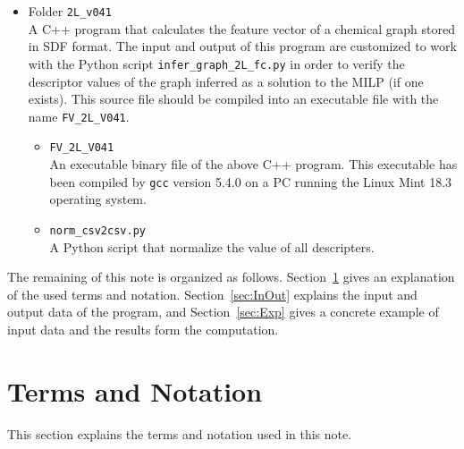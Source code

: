 \documentclass[11pt, titlepage, dvipdfmx, twoside]{article}
\begin{document}
\begin{itemize}
\begin{itemize}
\item Folder {\tt 2L\_v041}\\
A C++ program that calculates the feature vector of 
a chemical graph stored in SDF format.
The input and output of this program are customized to work with 
the Python script {\tt infer\_graph\_2L\_fc.py}
in order to verify the descriptor values
of the graph inferred as a solution to the MILP (if one exists).
This source file should be compiled into an executable file
with the name {\tt FV\_2L\_V041}.
\begin{itemize}
\item {\tt FV\_2L\_V041}\\
An executable binary file of the above C++ program.
This executable has been compiled 
by {\tt gcc} version 5.4.0
on a PC running the Linux Mint 18.3 operating system.
%
\item {\tt norm\_csv2csv.py}\\
A Python script that normalize the value of all descripters.
\end{itemize}

\end{itemize}
\end{itemize}



The remaining of this note is organized as follows.
Section~\ref{sec:Pre} gives an explanation 
of the used terms and notation.
%
Section~\ref{sec:InOut} explains the 
input and output data of the program,
and Section~\ref{sec:Exp} gives a concrete
example of input data and the results form the computation.


\section{Terms and Notation}
\label{sec:Pre}
%
This section explains the terms and notation used in this note.
\end{document}
